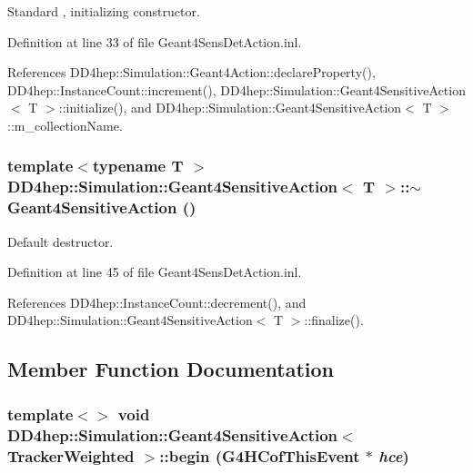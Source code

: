 Standard , initializing constructor. 

Definition at line 33 of file Geant4SensDetAction.inl.

References DD4hep::Simulation::Geant4Action::declareProperty(), DD4hep::InstanceCount::increment(), DD4hep::Simulation::Geant4SensitiveAction$<$ T $>$::initialize(), and DD4hep::Simulation::Geant4SensitiveAction$<$ T $>$::m\_\-collectionName.\hypertarget{class_d_d4hep_1_1_simulation_1_1_geant4_sensitive_action_a2f233b92d70c7303055662c753063c7f}{
\subsubsection[{$\sim$Geant4SensitiveAction}]{\setlength{\rightskip}{0pt plus 5cm}template$<$typename T $>$ {\bf DD4hep::Simulation::Geant4SensitiveAction}$<$ T $>$::$\sim${\bf Geant4SensitiveAction} ()}}
\label{class_d_d4hep_1_1_simulation_1_1_geant4_sensitive_action_a2f233b92d70c7303055662c753063c7f}


Default destructor. 

Definition at line 45 of file Geant4SensDetAction.inl.

References DD4hep::InstanceCount::decrement(), and DD4hep::Simulation::Geant4SensitiveAction$<$ T $>$::finalize().

\subsection{Member Function Documentation}
\hypertarget{class_d_d4hep_1_1_simulation_1_1_geant4_sensitive_action_aa038cfe9345e32eccee5b0022b2b48c4}{
\subsubsection[{begin}]{\setlength{\rightskip}{0pt plus 5cm}template$<$$>$ void {\bf DD4hep::Simulation::Geant4SensitiveAction}$<$ {\bf TrackerWeighted} $>$::begin (G4HCofThisEvent $\ast$ {\em hce})}}
\label{class_d_d4hep_1_1_simulation_1_1_geant4_sensitive_action_aa038cfe9345e32eccee5b0022b2b48c4}


